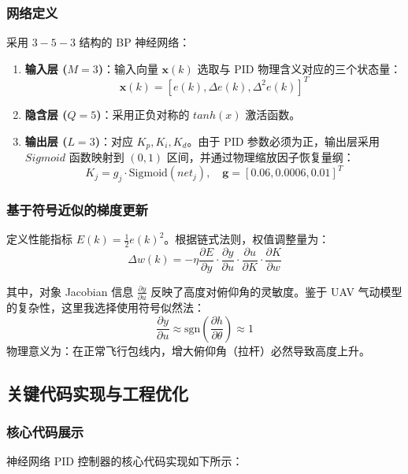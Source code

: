 \documentclass[UTF8, a4paper, 12pt]{ctexart}
\begin{document}
\subsubsection{网络定义}
采用 $3-5-3$ 结构的 BP 神经网络：
\begin{enumerate}
    \item \textbf{输入层 ($M=3$)}：输入向量 $\mathbf{x}(k)$ 选取与 PID 物理含义对应的三个状态量：
    \begin{equation}
        \mathbf{x}(k) = [e(k), \Delta e(k), \Delta^2 e(k)]^T
    \end{equation}
    \item \textbf{隐含层 ($Q=5$)}：采用正负对称的 $tanh(x)$ 激活函数。
    \item \textbf{输出层 ($L=3$)}：对应 $K_p, K_i, K_d$。由于 PID 参数必须为正，输出层采用 $Sigmoid$ 函数映射到 $(0,1)$ 区间，并通过物理缩放因子恢复量纲：
    \begin{equation}
        K_j = g_j \cdot \text{Sigmoid}(net_j), \quad \mathbf{g} = [0.06, 0.0006, 0.01]^T
    \end{equation}
\end{enumerate}

\subsubsection{基于符号近似的梯度更新}
定义性能指标 $E(k) = \frac{1}{2} e(k)^2$。根据链式法则，权值调整量为：
\begin{equation}
    \Delta w(k) = -\eta \frac{\partial E}{\partial y} \cdot \frac{\partial y}{\partial u} \cdot \frac{\partial u}{\partial K} \cdot \frac{\partial K}{\partial w}
\end{equation}

其中，对象 Jacobian 信息 $\frac{\partial y}{\partial u}$ 反映了高度对俯仰角的灵敏度。鉴于 UAV 气动模型的复杂性，这里我选择使用符号似然法：
\begin{equation}
    \frac{\partial y}{\partial u} \approx \text{sgn} \left( \frac{\partial h}{\partial \theta} \right) \approx 1
\end{equation}
物理意义为：在正常飞行包线内，增大俯仰角（拉杆）必然导致高度上升。

\subsection{关键代码实现与工程优化}

\subsubsection{核心代码展示}
神经网络 PID 控制器的核心代码实现如下所示：
\end{document}
